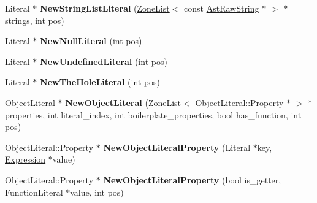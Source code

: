 \begin{DoxyCompactItemize}
\item 
\hypertarget{classv8_1_1internal_1_1_b_a_s_e___e_m_b_e_d_d_e_d_a6e5697c460beeb5a662b969000090519}{}Literal $\ast$ {\bfseries New\+String\+List\+Literal} (\hyperlink{classv8_1_1internal_1_1_zone_list}{Zone\+List}$<$ const \hyperlink{classv8_1_1internal_1_1_ast_raw_string}{Ast\+Raw\+String} $\ast$ $>$ $\ast$strings, int pos)\label{classv8_1_1internal_1_1_b_a_s_e___e_m_b_e_d_d_e_d_a6e5697c460beeb5a662b969000090519}

\item 
\hypertarget{classv8_1_1internal_1_1_b_a_s_e___e_m_b_e_d_d_e_d_a3deda1d60109daa8ab3ad9dd49c9cea1}{}Literal $\ast$ {\bfseries New\+Null\+Literal} (int pos)\label{classv8_1_1internal_1_1_b_a_s_e___e_m_b_e_d_d_e_d_a3deda1d60109daa8ab3ad9dd49c9cea1}

\item 
\hypertarget{classv8_1_1internal_1_1_b_a_s_e___e_m_b_e_d_d_e_d_a9f776af99f0c772ea6223ce067d1d2d1}{}Literal $\ast$ {\bfseries New\+Undefined\+Literal} (int pos)\label{classv8_1_1internal_1_1_b_a_s_e___e_m_b_e_d_d_e_d_a9f776af99f0c772ea6223ce067d1d2d1}

\item 
\hypertarget{classv8_1_1internal_1_1_b_a_s_e___e_m_b_e_d_d_e_d_a531acecf071dd5ab1b12e0e9c0d2bac4}{}Literal $\ast$ {\bfseries New\+The\+Hole\+Literal} (int pos)\label{classv8_1_1internal_1_1_b_a_s_e___e_m_b_e_d_d_e_d_a531acecf071dd5ab1b12e0e9c0d2bac4}

\item 
\hypertarget{classv8_1_1internal_1_1_b_a_s_e___e_m_b_e_d_d_e_d_aade0b3403d03a1efa53b676cbab709d4}{}Object\+Literal $\ast$ {\bfseries New\+Object\+Literal} (\hyperlink{classv8_1_1internal_1_1_zone_list}{Zone\+List}$<$ Object\+Literal\+::\+Property $\ast$ $>$ $\ast$properties, int literal\+\_\+index, int boilerplate\+\_\+properties, bool has\+\_\+function, int pos)\label{classv8_1_1internal_1_1_b_a_s_e___e_m_b_e_d_d_e_d_aade0b3403d03a1efa53b676cbab709d4}

\item 
\hypertarget{classv8_1_1internal_1_1_b_a_s_e___e_m_b_e_d_d_e_d_a5a23b13605c23a0d5c1ca3e9bd8f1893}{}Object\+Literal\+::\+Property $\ast$ {\bfseries New\+Object\+Literal\+Property} (Literal $\ast$key, \hyperlink{classv8_1_1internal_1_1_expression}{Expression} $\ast$value)\label{classv8_1_1internal_1_1_b_a_s_e___e_m_b_e_d_d_e_d_a5a23b13605c23a0d5c1ca3e9bd8f1893}

\item 
\hypertarget{classv8_1_1internal_1_1_b_a_s_e___e_m_b_e_d_d_e_d_aec7d14fa6753643c514b04798f2fcce5}{}Object\+Literal\+::\+Property $\ast$ {\bfseries New\+Object\+Literal\+Property} (bool is\+\_\+getter, Function\+Literal $\ast$value, int pos)\label{classv8_1_1internal_1_1_b_a_s_e___e_m_b_e_d_d_e_d_aec7d14fa6753643c514b04798f2fcce5}


\end{DoxyCompactItemize}
